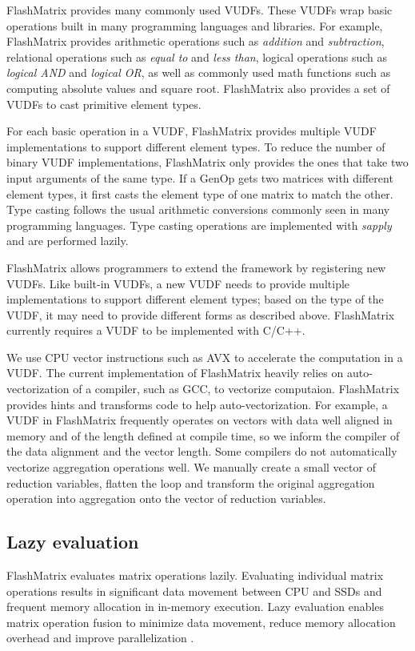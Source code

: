 FlashMatrix provides many commonly used VUDFs. These VUDFs wrap
basic operations built in many programming languages and libraries. For example,
FlashMatrix provides arithmetic operations such as \textit{addition} and
\textit{subtraction}, relational operations such as \textit{equal to} and
\textit{less than}, logical operations such as \textit{logical AND} and
\textit{logical OR}, as well as commonly used math functions such as computing
absolute values and square root. FlashMatrix also provides a set of VUDFs to
cast primitive element types.

For each basic operation in a VUDF, FlashMatrix provides multiple VUDF
implementations to support different element types. To reduce the number
of binary VUDF implementations, FlashMatrix only provides the ones that take
two input arguments of the same type. If a GenOp gets two matrices with different
element types, it first casts the element type of one matrix to match
the other. Type casting follows the usual arithmetic conversions \cite{}
commonly seen in many programming languages. Type casting operations are
implemented with \textit{sapply} and are performed lazily.

FlashMatrix allows programmers to extend the framework by registering new VUDFs.
Like built-in VUDFs, a new VUDF needs to provide multiple
implementations to support different element types; based on the type of
the VUDF, it may need to provide different forms as described above.
FlashMatrix currently requires a VUDF to be implemented with C/C++.

We use CPU vector instructions such as AVX \cite{avx} to accelerate
the computation in a VUDF. The current implementation of FlashMatrix heavily
relies on auto-vectorization of a compiler, such as GCC, to vectorize
computaion. FlashMatrix provides hints and
transforms code to help auto-vectorization. For example, a VUDF in FlashMatrix
frequently operates on vectors with data well aligned in memory and of
the length defined at compile time, so we inform the compiler of the data alignment
and the vector length. Some compilers do not automatically vectorize
aggregation operations well. We manually create a small vector of reduction
variables, flatten the loop and transform the original aggregation operation
into aggregation onto the vector of reduction variables.

\subsection{Lazy evaluation} \label{sec:lazy_eval}
FlashMatrix evaluates matrix operations lazily. Evaluating individual
matrix operations results in significant data movement between CPU and SSDs
and frequent memory allocation in in-memory execution.
Lazy evaluation enables matrix operation fusion to minimize data movement,
reduce memory allocation overhead and improve parallelization \cite{Ching12}.

